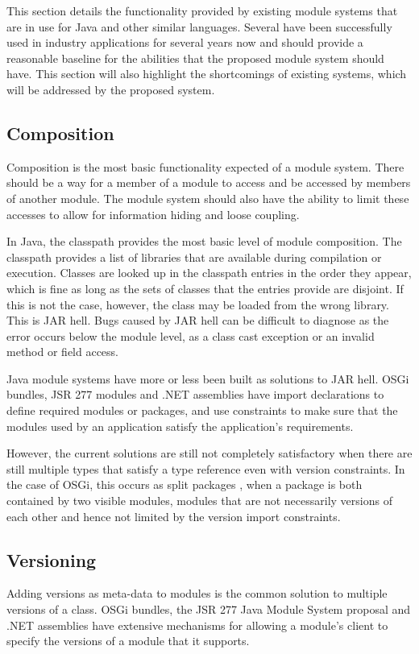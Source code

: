 This section details the functionality provided by existing module systems that
are in use for Java and other similar languages. 
Several \cite{javajars, OSGi4, netassemblies} have been successfully used in industry 
applications for several years now and should provide a reasonable baseline
for the abilities that the proposed module system should have. This section will also
highlight the shortcomings of existing systems, which will be addressed by the
proposed system.

\subsection{Composition}

Composition is the most basic functionality expected of a module system. There
should be a way for a member of a module to access and be accessed by members of
another module. The module system should also have the ability to limit
these accesses to allow for information hiding and loose coupling.

In Java, the classpath provides the most basic level of module composition. 
The classpath provides a list of libraries that are
available during compilation or execution. Classes are looked up in the 
classpath entries in the order they appear, which is fine as long as the sets 
of classes that the entries provide are disjoint. If this is not the case, however, the class may
be loaded from the wrong library. This is JAR hell. Bugs caused by JAR hell
can be difficult to diagnose as the error occurs below the module level, as 
a class cast exception or an invalid method or field access.

Java module systems have more or less been built as solutions to JAR hell. 
OSGi \cite{OSGi4} bundles, JSR 277 modules \cite{JSR277} and .NET assemblies \cite{netassemblies}
have import declarations to define required modules or packages, and use constraints 
to make sure that the modules used by an application satisfy the 
application's requirements. 

However, the current solutions are still not completely satisfactory when there are still multiple
types that satisfy a type reference even with version constraints. In the case
of OSGi, this occurs as split packages \cite{iJAMComments}, when a package is both contained by
two visible modules, modules that are not necessarily versions of each other
and hence not limited by the version import constraints.

\subsection{Versioning}
Adding versions as meta-data to modules is the common solution to multiple
versions of a class. OSGi bundles, the JSR 277 Java Module System
proposal and .NET assemblies have extensive mechanisms for allowing a 
module's client to specify the versions of a module that it supports.


